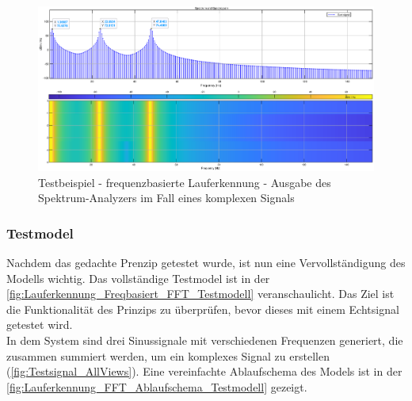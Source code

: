 \begin{figure}
	\centering
	\includegraphics[width=\textwidth]{Bilder/frequenzbasierte_Lauferkennung_SpectrumAnalyzer_Ausgabe2_eps.eps}
	\caption{Testbeispiel - frequenzbasierte Lauferkennung - Ausgabe des Spektrum-Analyzers im Fall eines komplexen Signals}
	\label{fig:Lauferkennung_Freqbasiert_SpektrumAnalyzerAusgabe_gezoomt}
\end{figure}

%

\subsubsection{Testmodel}
Nachdem das gedachte Prenzip getestet wurde, ist nun eine Vervollständigung des Modells wichtig. Das vollständige Testmodel ist in der \autoref{fig:Lauferkennung_Freqbasiert_FFT_Testmodell} veranschaulicht. Das Ziel ist die Funktionalität des Prinzips zu überprüfen, bevor dieses mit einem Echtsignal getestet wird.\\
In dem System sind drei Sinussignale mit verschiedenen Frequenzen generiert, die zusammen summiert werden, um ein komplexes Signal zu erstellen (\autoref{fig:Testsignal_AllViews}).
Eine vereinfachte Ablaufschema des Models ist in der \autoref{fig:Lauferkennung_FFT_Ablaufschema_Testmodell} gezeigt.

